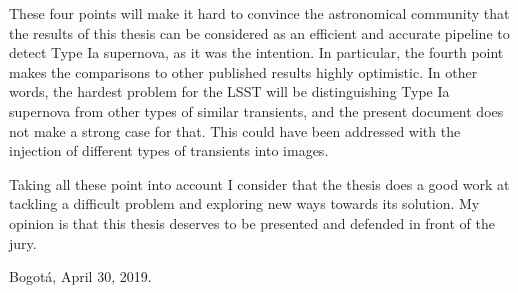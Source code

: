 \documentclass{article}
\begin{document}
These four points will make it hard to convince the astronomical community that the
results of this thesis can be considered as an efficient and accurate pipeline to
detect Type Ia supernova, as it was the intention. 
In particular, the fourth point makes the comparisons to other published results
highly optimistic. 
In other words, the hardest problem for the LSST will be distinguishing Type Ia
supernova from other types of similar transients, and the present document does not
make a strong case for that. This could have been addressed with the injection of
different types of transients into images.

Taking all these point into account I consider that the thesis does a good work at
tackling a difficult problem and exploring new ways towards its solution. My opinion
is that this thesis deserves to be presented and defended in front of the jury.

\vspace{2cm}
Bogot\'a, April 30, 2019.
\end{document}
